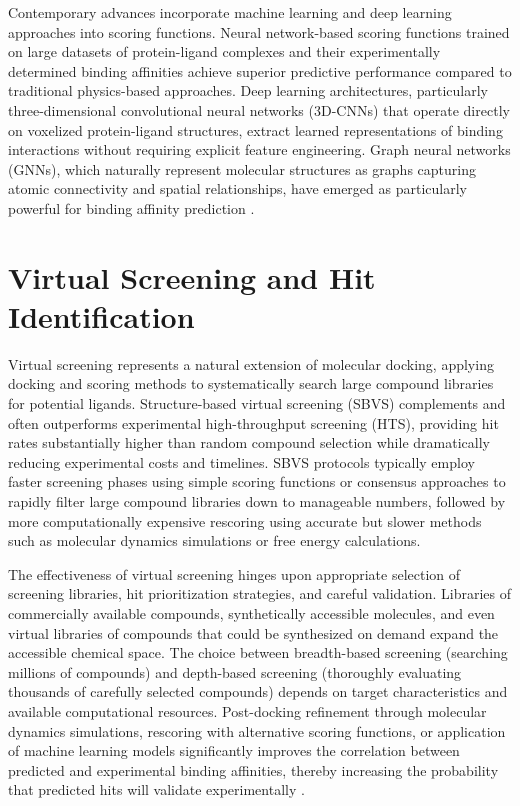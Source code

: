 \documentclass[12pt,a4paper]{article}
\begin{document}
Contemporary advances incorporate machine learning and deep learning approaches into scoring functions. Neural network-based scoring functions trained on large datasets of protein-ligand complexes and their experimentally determined binding affinities achieve superior predictive performance compared to traditional physics-based approaches. Deep learning architectures, particularly three-dimensional convolutional neural networks (3D-CNNs) that operate directly on voxelized protein-ligand structures, extract learned representations of binding interactions without requiring explicit feature engineering. Graph neural networks (GNNs), which naturally represent molecular structures as graphs capturing atomic connectivity and spatial relationships, have emerged as particularly powerful for binding affinity prediction \citep{Wallach2015,Ragoza2016,Gentile2020,Gentile2022}.

\section*{Virtual Screening and Hit Identification}

Virtual screening represents a natural extension of molecular docking, applying docking and scoring methods to systematically search large compound libraries for potential ligands. Structure-based virtual screening (SBVS) complements and often outperforms experimental high-throughput screening (HTS), providing hit rates substantially higher than random compound selection while dramatically reducing experimental costs and timelines. SBVS protocols typically employ faster screening phases using simple scoring functions or consensus approaches to rapidly filter large compound libraries down to manageable numbers, followed by more computationally expensive rescoring using accurate but slower methods such as molecular dynamics simulations or free energy calculations.

The effectiveness of virtual screening hinges upon appropriate selection of screening libraries, hit prioritization strategies, and careful validation. Libraries of commercially available compounds, synthetically accessible molecules, and even virtual libraries of compounds that could be synthesized on demand expand the accessible chemical space. The choice between breadth-based screening (searching millions of compounds) and depth-based screening (thoroughly evaluating thousands of carefully selected compounds) depends on target characteristics and available computational resources. Post-docking refinement through molecular dynamics simulations, rescoring with alternative scoring functions, or application of machine learning models significantly improves the correlation between predicted and experimental binding affinities, thereby increasing the probability that predicted hits will validate experimentally \citep{Pence2018,McGillewie2018}.
\end{document}
